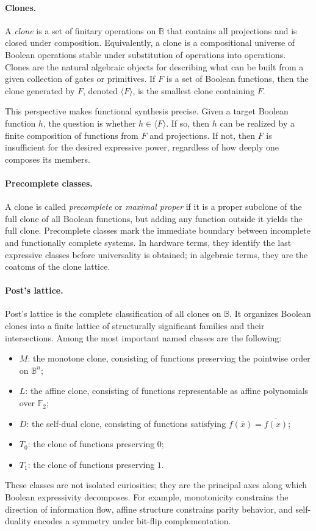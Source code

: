 \documentclass[11pt]{article}
\begin{document}
\paragraph{Clones.}
A \emph{clone} is a set of finitary operations on $\mathbb{B}$ that contains all projections and is closed under composition. Equivalently, a clone is a compositional universe of Boolean operations stable under substitution of operations into operations. Clones are the natural algebraic objects for describing what can be built from a given collection of gates or primitives. If $F$ is a set of Boolean functions, then the clone generated by $F$, denoted $\langle F\rangle$, is the smallest clone containing $F$.

This perspective makes functional synthesis precise. Given a target Boolean function $h$, the question is whether $h \in \langle F\rangle$. If so, then $h$ can be realized by a finite composition of functions from $F$ and projections. If not, then $F$ is insufficient for the desired expressive power, regardless of how deeply one composes its members.

\paragraph{Precomplete classes.}
A clone is called \emph{precomplete} or \emph{maximal proper} if it is a proper subclone of the full clone of all Boolean functions, but adding any function outside it yields the full clone. Precomplete classes mark the immediate boundary between incomplete and functionally complete systems. In hardware terms, they identify the last expressive classes before universality is obtained; in algebraic terms, they are the coatoms of the clone lattice.

\paragraph{Post's lattice.}
Post's lattice is the complete classification of all clones on $\mathbb{B}$. It organizes Boolean clones into a finite lattice of structurally significant families and their intersections. Among the most important named classes are the following:
\begin{itemize}
  \item $M$: the monotone clone, consisting of functions preserving the pointwise order on $\mathbb{B}^n$;
  \item $L$: the affine clone, consisting of functions representable as affine polynomials over $\mathbb{F}_2$;
  \item $D$: the self-dual clone, consisting of functions satisfying $f(\bar{x}) = \overline{f(x)}$;
  \item $T_0$: the clone of functions preserving $0$;
  \item $T_1$: the clone of functions preserving $1$.
\end{itemize}
These classes are not isolated curiosities; they are the principal axes along which Boolean expressivity decomposes. For example, monotonicity constrains the direction of information flow, affine structure constrains parity behavior, and self-duality encodes a symmetry under bit-flip complementation.
\end{document}
